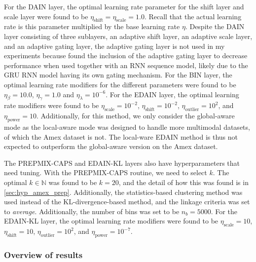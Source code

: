 \documentclass{statsmsc}
\begin{document}
{%
For the DAIN layer, the optimal learning rate parameter for the shift layer
and scale layer were found to be $\eta_{\textrm{shift}}=\eta_{\textrm{scale}}=1.0$. Recall that
the actual learning rate is this parameter multiplied by the base learning rate $\eta$.
Despite the \ac{DAIN} layer consisting of three sublayers, an adaptive shift layer, an adaptive
scale layer, and an adaptive gating layer, the adaptive gating layer is not used in my
experiments because \cite{dain} found the inclusion of the adaptive gating layer to decrease
performance when used together with an \ac{RNN} sequence model, likely due to the \ac{GRU}
\ac{RNN} model having its own gating mechanism.
For the \ac{BIN} layer, the optimal learning rate modifiers for the different parameters were
found to be $\eta_\beta=10.0$, $\eta_\gamma=1.0$ and $\eta_\lambda=10^{-6}$.
For the \ac{EDAIN} layer, the optimal learning rate modifiers were found to be
$\eta_{\textrm{scale}}=10^{-2}$, $\eta_{\textrm{shift}}=10^{-2}$, $\eta_{\textrm{outlier}}=10^{2}$,
and $\eta_{\textrm{power}}=10$. Additionally, for this method, we only consider the global-aware
mode as the local-aware mode was designed to handle more multimodal datasets, of which the Amex
dataset is not. The local-ware \ac{EDAIN} method is thus not expected to outperform the global-aware
version on the Amex dataset.

The \ac{PREPMIX-CAPS} and \ac{EDAIN-KL} layers also have hyperparameters that need
tuning. With the \ac{PREPMIX-CAPS} routine, we need to select $k$. The optimal $k \in \mathbb{N}$
was found to be $k=20$, and the detail of how this was found is in \cref{sec:hyp_amex_prep}.
Additionally, the statistics-based clustering method was used instead of the \ac{KL-divergence}-based
method, and the linkage criteria was set to \textit{average}. Additionally, the number of bins
was set to be $n_{b}=5000$. For the \ac{EDAIN-KL} layer, the optimal learning
rate modifiers were found to be
$\eta_{\textrm{scale}}=10$, $\eta_{\textrm{shift}}=10$, $\eta_{\textrm{outlier}}=10^{2}$,
and $\eta_{\textrm{power}}=10^{-7}$.


\subsubsection{Overview of results}%
\label{ssub:amex-results}

}
\end{document}
